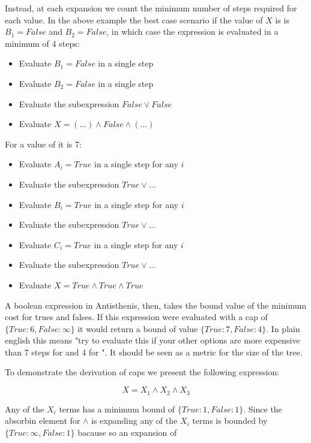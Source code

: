 Instead, at each expansion we count the minimum number of steps
required for each value. In the above example the best case scenario
if the value of \(X\) is  is \(B_1 = False\) and
\(B_2 = False\), in which case the expression is evaluated in a
minimum of 4 steps:

\begin{itemize}
\item Evaluate \(B_1 = False\) in a single step
\item Evaluate \(B_2 = False\) in a single step
\item Evaluate the subexpression \(False \lor False\)
\item Evaluate \(X = (...) \land False \land (...)\)
\end{itemize}

For a value of  it is 7:

\begin{itemize}
\item Evaluate \(A_i = True\) in a single step for any \(i\)
\item Evaluate the subexpression \(True \lor ...\)
\item Evaluate \(B_i = True\) in a single step for any \(i\)
\item Evaluate the subexpression \(True \lor ...\)
\item Evaluate \(C_i = True\) in a single step for any \(i\)
\item Evaluate the subexpression \(True \lor ...\)
\item Evaluate \(X = True \land True \land True\)
\end{itemize}

A boolean expression in Antisthenis, then, takes the bound value of
the minimum cost for trues and falses. If this expression were
evaluated with a cap of \(\{True: 6, False: \infty \}\) it would
return a bound of value \(\{True: 7, False: 4 \}\). In plain english
this means "try to evaluate this if your other options are more
expensive than 7 steps for  and 4 for ". It
should be seen as a metric for the size of the tree.

To demonstrate the derivation of caps we present the following
expression:

\[
X = X_1 \land X_2 \land X_3
\]

Any of the \(X_i\) terms has a minimum bound of
\(\{True: 1, False: 1 \}\). Since the absorbin element for \(\land\)
is  expanding any of the \(X_i\) terms is bounded by
\(\{True: \infty, False: 1 \}\) bacause so an expansion of

